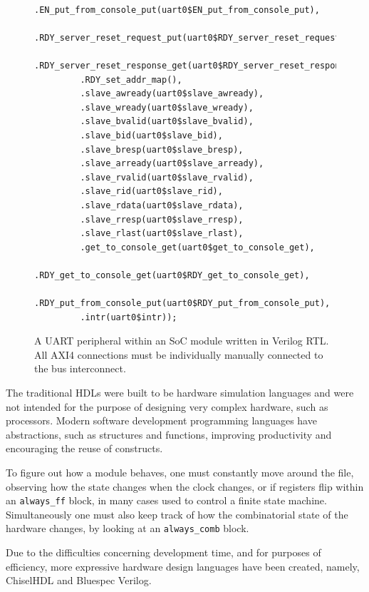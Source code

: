\documentclass[a4paper,8pt]{report}
\begin{document}
\begin{figure}[h]
\begin{BVerbatim}
         .EN_put_from_console_put(uart0$EN_put_from_console_put),
         .RDY_server_reset_request_put(uart0$RDY_server_reset_request_put),
         .RDY_server_reset_response_get(uart0$RDY_server_reset_response_get),
         .RDY_set_addr_map(),
         .slave_awready(uart0$slave_awready),
         .slave_wready(uart0$slave_wready),
         .slave_bvalid(uart0$slave_bvalid),
         .slave_bid(uart0$slave_bid),
         .slave_bresp(uart0$slave_bresp),
         .slave_arready(uart0$slave_arready),
         .slave_rvalid(uart0$slave_rvalid),
         .slave_rid(uart0$slave_rid),
         .slave_rdata(uart0$slave_rdata),
         .slave_rresp(uart0$slave_rresp),
         .slave_rlast(uart0$slave_rlast),
         .get_to_console_get(uart0$get_to_console_get),
         .RDY_get_to_console_get(uart0$RDY_get_to_console_get),
         .RDY_put_from_console_put(uart0$RDY_put_from_console_put),
         .intr(uart0$intr));
\end{BVerbatim}
\normalsize
\caption{A UART peripheral within an SoC module written in Verilog RTL. All AXI4 connections must be
  individually manually connected to the bus interconnect.}
\label{fig:uart_wires}
\end{figure}

The traditional HDLs were built to be hardware simulation languages and were not
intended for the purpose of designing very complex hardware, such as processors.
Modern software development programming languages have abstractions, such as
structures and functions, improving productivity and encouraging the reuse of
constructs.

To figure out how a module behaves, one must constantly move around the file,
observing how the state changes when the clock changes, or if registers flip
within an \texttt{always\_ff} block, in many cases used to control a finite state
machine. Simultaneously one must also keep track of how the combinatorial state
of the hardware changes, by looking at an \texttt{always\_comb} block.

Due to the difficulties concerning development time, and for purposes of
efficiency, more expressive hardware design languages have been created, namely,
ChiselHDL\cite{chisel} and Bluespec Verilog\cite{bluespec}.

\end{document}

